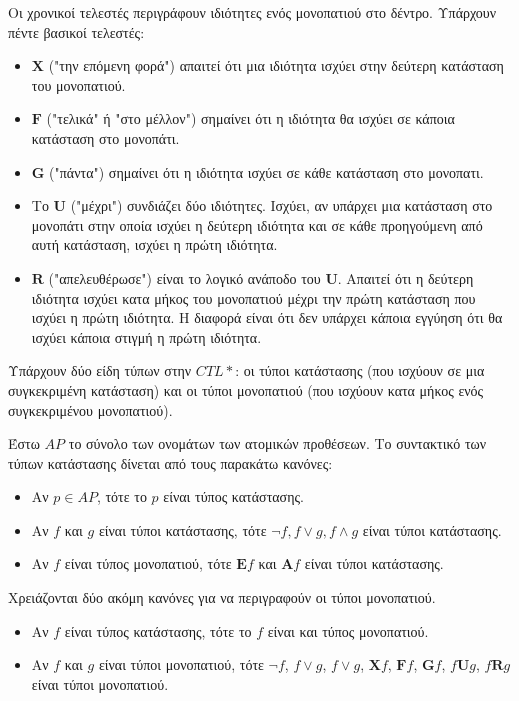\documentclass{article}
\begin{document}
 Οι χρονικοί τελεστές περιγράφουν ιδιότητες ενός μονοπατιού στο δέντρο. Υπάρχουν πέντε βασικοί τελεστές:

 \begin{itemize}
\item $\mathbf{X}$ ("την επόμενη φορά") απαιτεί ότι μια ιδιότητα ισχύει στην δεύτερη κατάσταση του μονοπατιού.
\item $\mathbf{F}$ ("τελικά" ή "στο μέλλον") σημαίνει ότι η ιδιότητα θα ισχύει σε κάποια κατάσταση στο μονοπάτι.
\item $\mathbf{G}$ ("πάντα") σημαίνει ότι η ιδιότητα ισχύει σε κάθε κατάσταση στο μονοπατι.
\item Το $\mathbf{U}$ ("μέχρι") συνδιάζει δύο ιδιότητες. Ισχύει, αν υπάρχει μια κατάσταση στο μονοπάτι στην οποία ισχύει η δεύτερη ιδιότητα και σε κάθε προηγούμενη από αυτή κατάσταση, ισχύει η πρώτη ιδιότητα.
\item $\mathbf{R}$ ("απελευθέρωσε") είναι το λογικό ανάποδο του $\mathbf{U}$. Απαιτεί ότι η δεύτερη ιδιότητα ισχύει κατα μήκος του μονοπατιού μέχρι την πρώτη κατάσταση που ισχύει η πρώτη ιδιότητα. Η διαφορά είναι ότι δεν υπάρχει κάποια εγγύηση ότι θα ισχύει κάποια στιγμή η πρώτη ιδιότητα.
\end{itemize}

Υπάρχουν δύο είδη τύπων στην $CTL*$: οι τύποι κατάστασης (που ισχύουν σε μια συγκεκριμένη κατάσταση) και οι τύποι μονοπατιού (που ισχύουν κατα μήκος ενός συγκεκριμένου μονοπατιού). 

Έστω $AP$ το σύνολο των ονομάτων των ατομικών προθέσεων. Το συντακτικό των τύπων κατάστασης δίνεται από τους παρακάτω κανόνες:

\begin{itemize}
    \item Αν $p \in AP$, τότε το $p$ είναι τύπος κατάστασης.
    \item Αν $f$ και $g$ είναι τύποι κατάστασης, τότε $\neg f, f \vee g, f \wedge g$ είναι τύποι κατάστασης.
    \item Αν $f$ είναι τύπος μονοπατιού, τότε $\mathbf{E} f$ και $\mathbf{A} f$ είναι τύποι κατάστασης.
\end{itemize}

Χρειάζονται δύο ακόμη κανόνες για να περιγραφούν οι τύποι μονοπατιού.
\begin{itemize}
    \item Αν $f$ είναι τύπος κατάστασης, τότε το $f$ είναι και τύπος μονοπατιού.
    \item Αν $f$ και $g$ είναι τύποι μονοπατιού, τότε $\neg f$, $f \vee g$, $f \vee g$, $\mathbf{X} f$, $\mathbf{F} f$, $\mathbf{G} f$, $f \mathbf{U} g$, $f \mathbf{R} g$ είναι τύποι μονοπατιού.
\end{itemize}
\end{document}
